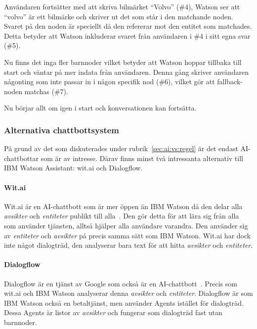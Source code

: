 \documentclass[a4paper,12pt]{article}
\begin{document}
Användaren fortsätter med att skriva bilmärket ``Volvo'' (\#4), Watson ser att ``volvo'' är ett bilmärke och skriver ut det som står i den matchande noden. Svaret på den noden är speciellt då den refererar mot den entitet som matchades. Detta betyder att Watson inkluderar svaret från användaren i \#4 i sitt egna svar (\#5).

Nu finns det inga fler barnnoder vilket betyder att Watson hoppar tillbaka till start och väntar på mer indata från användaren. Denna gång skriver användaren någonting som inte passar in i någon specifik nod (\#6), vilket gör att fallback-noden matchas (\#7).

Nu börjar allt om igen i start och konversationen kan fortsätta.

\FloatBarrier

\subsubsection{Alternativa chattbottsystem}
\label{sec:alternativa:chattbottar}

På grund av det som diskuterades under rubrik~\ref{sec:ai:vs:regel} är det endast AI-chattbottar som är av intresse. Därav finns minst två intressanta alternativ till IBM Watson Assistant: wit.ai och Dialogflow.

\paragraph{Wit.ai} Wit.ai är en AI-chattbott som är mer öppen än IBM Watson då den delar alla \emph{avsikter} och \emph{entiteter} publikt till alla~\cite{web:witai}. Den gör detta för att lära sig från alla som använder tjänsten, alltså hjälper alla användare varandra. Den använder sig av \emph{entiteter} och \emph{avsikter} på precis samma sätt som IBM Watson. Wit.ai har dock inte något dialogträd, den analyserar bara text för att hitta \emph{avsikter} och \emph{entiteter}.

\paragraph{Dialogflow} Dialogflow är en tjänst av Google som också är en AI-chattbott~\cite{web:dialogflow}. Precis som wit.ai och IBM Watson analyserar denna \emph{avsikter} och \emph{entiteter}. Dialogflow är som IBM Watson också en betaltjänst, men använder Agents istället för dialogträd. Dessa Agents är listor av \emph{avsikter} och fungerar som dialogträd fast utan barnnoder.
\end{document}

